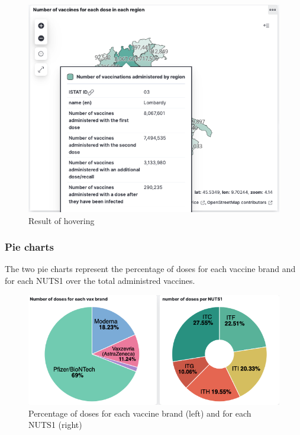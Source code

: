 \documentclass[12pt, a4paper]{article}
\begin{document}
\begin{figure}[H]
  \centering
  \includegraphics[width=.8\linewidth]{img (5).png}
\caption*{Result of hovering}
\end{figure}

\subsubsection{Pie charts}
The two pie charts represent the percentage of doses for each vaccine brand and for each NUTS1 over the total administred vaccines.
\begin{figure}[H]
  \centering
  \includegraphics[width=1\linewidth]{img (7).png}
\caption*{Percentage of doses for each vaccine brand  (left) and for each NUTS1 (right)}
\end{figure}
\end{document}
